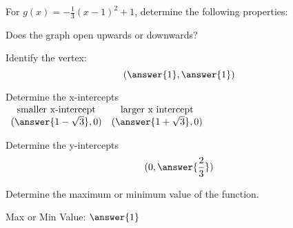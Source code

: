\documentclass{ximera}
\author{David Kish}
\begin{document}
For $g(x) = -\frac{1}{3}(x-1)^2+1$, determine the following properties:
\begin{exercise}
Does the graph open upwards or downwards?
\begin{multipleChoice}
\end{multipleChoice}
\end{exercise}
\begin{exercise}
Identify the vertex:
\[
(\answer{1},\answer{1})
\]
\end{exercise}
\begin{exercise}
Determine the x-intercepts\\
$
\begin{array}{cc}
\text{smaller x-intercept} & \text{larger x intercept}\\
(\answer{1-\sqrt{3}},0) & (\answer{1+\sqrt{3}},0)
\end{array}
$
\end{exercise}
\begin{exercise}
Determine the y-intercepts
\[
(0,\answer{\frac{2}{3}})
\]
\end{exercise}
\begin{exercise}
Determine the maximum or minimum value of the function.
\begin{multipleChoice}
\end{multipleChoice}
Max or Min Value: $\answer{1}$
\end{exercise}
\end{document}
